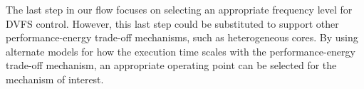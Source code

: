 The last step in our flow focuses on selecting an appropriate
frequency level for DVFS control. However, this last step could be substituted to
support other performance-energy trade-off mechanisms, such as heterogeneous
cores. By using alternate models for how the execution time scales with the
performance-energy trade-off mechanism, an appropriate operating point can be
selected for the mechanism of interest.
